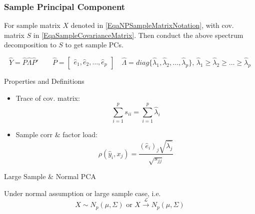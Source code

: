     
\subsubsection{Sample Principal Component}
    For sample matrix $ X $ denoted in \autoref{EqaNPSampleMatrixNotation}, with cov. matrix $ S $ in \autoref{EqaSampleCovarianceMatrix}. Then conduct the above spectrum decomposition to $ S $ to get sample PCs.

    
    \begin{equation}
        \hat{Y}=\hat{P}\hat{\Lambda }\hat{P}' \qquad \hat{P}=\begin{bmatrix}
            \hat{e}_1,\hat{e}_2,\ldots,\hat{e}_p
        \end{bmatrix} 
        \quad \hat{\Lambda} =diag\{\hat{\lambda} _1,\hat{\lambda} _2,\ldots,\hat{\lambda} _p\},\, \hat{\lambda} _1\geq\hat{\lambda} _2\geq\ldots\geq\hat{\lambda} _p
    \end{equation}
    
    Properties and Definitions 
    \begin{itemize}[topsep=2pt,itemsep=2pt]
        \item Trace of cov. matrix:
        \begin{equation}
            \sum_{i=1}^ps _{ii}=\sum_{i=1}^p\hat{\lambda}_i
        \end{equation}
        
        
        \item Sample corr \& factor load:
        \begin{equation}
             \rho (\hat{y}_i,x_j)=\dfrac{(\hat{e}_{i})_j\sqrt{\hat{\lambda _j}}}{\sqrt{s_{jj}}}
        \end{equation}
    \end{itemize}
    
    \begin{point}
        Large Sample \& Normal PCA
    \end{point}
    
    Under normal assumption or large sample case, i.e. 
    \begin{equation}
        X\sim N_p(\mu,\Sigma ) \text{ or } X\xrightarrow[]{\mathscr{L}} N_p(\mu,\Sigma )
    \end{equation}
    
